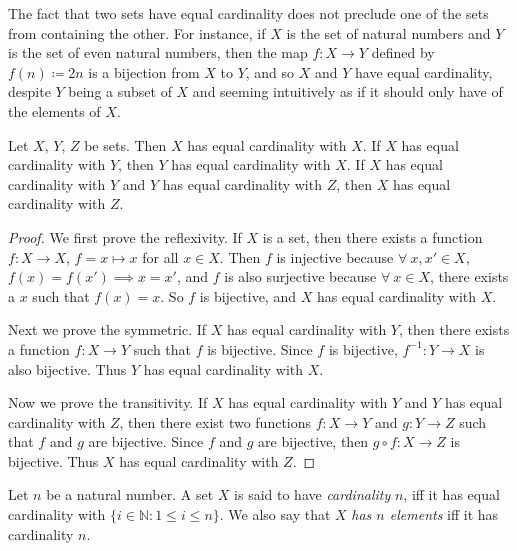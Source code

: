 \setcounter{theorem}{2}
\begin{remark}\label{3.6.3}
The fact that two sets have equal cardinality does not preclude one of the sets from containing the other.
For instance, if \(X\) is the set of natural numbers and \(Y\) is the set of even natural numbers, then the map \(f : X \to Y\) defined by \(f(n) \coloneqq 2n\) is a bijection from \(X\) to \(Y\), and so \(X\) and \(Y\) have equal cardinality, despite \(Y\) being a subset of \(X\) and seeming intuitively as if it should only have  of the elements of \(X\).
\end{remark}

\begin{proposition}\label{3.6.4}
Let \(X\), \(Y\), \(Z\) be sets.
Then \(X\) has equal cardinality with \(X\).
If \(X\) has equal cardinality with \(Y\), then \(Y\) has equal cardinality with \(X\).
If \(X\) has equal cardinality with \(Y\) and \(Y\) has equal cardinality with \(Z\), then \(X\) has equal cardinality with \(Z\).
\end{proposition}

\begin{proof}
We first prove the reflexivity.
If \(X\) is a set, then there exists a function \(f : X \to X\), \(f = x \mapsto x\) for all \(x \in X\).
Then \(f\) is injective because \(\forall\ x, x' \in X\), \(f(x) = f(x') \implies x = x'\), and \(f\) is also surjective because \(\forall\ x \in X\), there exists a \(x\) such that \(f(x) = x\).
So \(f\) is bijective, and \(X\) has equal cardinality with \(X\).

Next we prove the symmetric.
If \(X\) has equal cardinality with \(Y\), then there exists a function \(f : X \to Y\) such that \(f\) is bijective.
Since \(f\) is bijective, \(f^{-1} : Y \to X\) is also bijective.
Thus \(Y\) has equal cardinality with \(X\).

Now we prove the transitivity.
If \(X\) has equal cardinality with \(Y\) and \(Y\) has equal cardinality with \(Z\), then there exist two functions \(f : X \to Y\) and \(g : Y \to Z\) such that \(f\) and \(g\) are bijective.
Since \(f\) and \(g\) are bijective, then \(g \circ f : X \to Z\) is bijective.
Thus \(X\) has equal cardinality with \(Z\).
\end{proof}

\begin{definition}\label{3.6.5}
Let \(n\) be a natural number.
A set \(X\) is said to have \emph{cardinality} \(n\), iff it has equal cardinality with \(\{i \in \mathds{N} : 1 \leq i \leq n\}\).
We also say that \(X\) \emph{has \(n\) elements} iff it has cardinality \(n\).
\end{definition}


